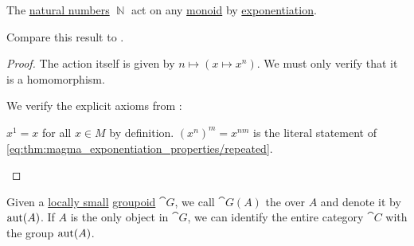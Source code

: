 \begin{proposition}\label{thm:natural_numbers_monoid_action}
  The \hyperref[def:set_of_natural_numbers]{natural numbers} \( \BbbN \) act on any \hyperref[def:unital_magma/monoid]{monoid} by \hyperref[def:unital_magma/exponentiation]{exponentiation}.

  Compare this result to .
\end{proposition}
\begin{proof}
  The action itself is given by \( n \mapsto (x \mapsto x^n) \). We must only verify that it is a homomorphism.

  We verify the explicit axioms from :
  \begin{refenum}
     \( x^1 = x \) for all \( x \in M \) by definition.
     \( (x^n)^m = x^{nm} \) is the literal statement of \eqref{eq:thm:magma_exponentiation_properties/repeated}.
  \end{refenum}
\end{proof}

\begin{definition}\label{def:automorphism_group}
  Given a \hyperref[def:category_size]{locally small} \hyperref[def:groupoid]{groupoid} \( \cat{G} \), we call \( \cat{G}(A) \) the  over \( A \) and denote it by \( \operatorname{aut}(A) \). If \( A \) is the only object in \( \cat{G} \), we can identify the entire category \( \cat{C} \) with the group \( \operatorname{aut}(A) \).
\end{definition}

